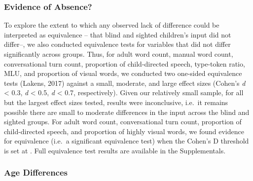 \documentclass[
  man,floatsintext]{apa6}
\begin{document}
\hypertarget{evidence-of-absence}{%
\subsubsection{Evidence of Absence?}\label{evidence-of-absence}}

To explore the extent to which any observed lack of difference could be interpreted as equivalence -- that blind and sighted children's input did not differ--, we also conducted equivalence tests for variables that did not differ significantly across groups. Thus, for adult word count, manual word count, conversational turn count, proportion of child-directed speech, type-token ratio, MLU, and proportion of visual words, we conducted two one-sided equivalence tests (Lakens, 2017) against a small, moderate, and large effect sizes (Cohen's \textbar{}\emph{d}\textbar{} \textless{} 0.3, \textbar{}\emph{d}\textbar{} \textless{} 0.5, \emph{d} \textless{} 0.7, respectively). Given our relatively small sample, for all but the largest effect sizes tested, results were inconclusive, i.e.~it remains possible there are small to moderate differences in the input across the blind and sighted groups. For adult word count, conversational turn count, proportion of child-directed speech, and proportion of highly visual words, we found evidence for equivalence (i.e.~a significant equivalence test) when the Cohen's D threshold is set at \textbar. Full equivalence test results are available in the Supplementals.

\hypertarget{age-differences}{%
\subsubsection{Age Differences}\label{age-differences}}
\end{document}
